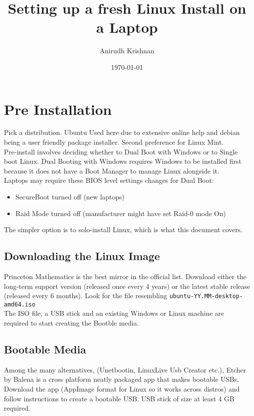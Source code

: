 \documentclass[8pt,letterpaper,twocolumn]{article}
\title{Setting up a fresh Linux Install on a Laptop}
\author{Anirudh Krishnan}
\date{\today}
\begin{document}
\maketitle
\newpage

\tableofcontents
\newpage

\section{Pre Installation}

Pick a distribution. Ubuntu Used here due to extensive online help and debian being a user friendly package installer. Second preference for Linux Mint. \\

Pre-install involves deciding whether to Dual Boot with Windows or to Single boot Linux. Dual Booting with Windows requires Windows to be installed first because it does not have a Boot Manager to manage Linux alongside it. \\

Laptops may require these BIOS level settings changes for Dual Boot:

\begin{itemize}
	\item SecureBoot turned off (new laptops)
	\item Raid Mode turned off (manufacturer might have set Raid-0 mode On)
\end{itemize}

The simpler option is to solo-install Linux, which is what this document covers.

\subsection{Downloading the Linux Image}

Princeton Mathematics is the best mirror in the official list. Download either the long-term support version (released once every 4 years) or the latest stable release (released every 6 months). Look for the file resembling \texttt{ubuntu-YY.MM-desktop-amd64.iso} \\

The ISO file, a USB stick and an existing Windows or Linux machine are required to start creating the Bootble media.



\subsection{Bootable Media}
Among the many alternatives, (Unetbootin, LinuxLive Usb Creator etc.), Etcher by Balena is a cross platform neatly packaged app that makes bootable USBs. Download the app (AppImage format for Linux so it works across distros) and follow instructions to create a bootable USB. USB stick of size at least 4 GB required.\\
\end{document}
